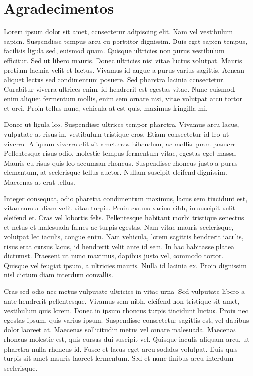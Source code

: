 \documentclass[12pt,twoside,a4paper]{book}
\begin{document}
\chapter*{Agradecimentos}



Lorem ipsum dolor sit amet, consectetur adipiscing elit. Nam vel vestibulum sapien. Suspendisse tempus arcu eu porttitor dignissim. Duis eget sapien tempus, facilisis ligula sed, euismod quam. Quisque ultricies non purus vestibulum efficitur. Sed ut libero mauris. Donec ultricies nisi vitae luctus volutpat. Mauris pretium lacinia velit et luctus. Vivamus id augue a purus varius sagittis. Aenean aliquet lectus sed condimentum posuere. Sed pharetra lacinia consectetur. Curabitur viverra ultrices enim, id hendrerit est egestas vitae. Nunc euismod, enim aliquet fermentum mollis, enim sem ornare nisi, vitae volutpat arcu tortor et orci. Proin tellus nunc, vehicula at est quis, maximus fringilla mi.

Donec ut ligula leo. Suspendisse ultrices tempor pharetra. Vivamus arcu lacus, vulputate at risus in, vestibulum tristique eros. Etiam consectetur id leo ut viverra. Aliquam viverra elit sit amet eros bibendum, ac mollis quam posuere. Pellentesque risus odio, molestie tempus fermentum vitae, egestas eget massa. Mauris eu risus quis leo accumsan rhoncus. Suspendisse rhoncus justo a purus elementum, at scelerisque tellus auctor. Nullam suscipit eleifend dignissim. Maecenas at erat tellus.

Integer consequat, odio pharetra condimentum maximus, lacus sem tincidunt est, vitae cursus diam velit vitae turpis. Proin cursus varius nibh, in suscipit velit eleifend et. Cras vel lobortis felis. Pellentesque habitant morbi tristique senectus et netus et malesuada fames ac turpis egestas. Nam vitae mauris scelerisque, volutpat leo iaculis, congue enim. Nam vehicula, lorem sagittis hendrerit iaculis, risus erat cursus lacus, id hendrerit velit ante id sem. In hac habitasse platea dictumst. Praesent ut nunc maximus, dapibus justo vel, commodo tortor. Quisque vel feugiat ipsum, a ultricies mauris. Nulla id lacinia ex. Proin dignissim nisl dictum diam interdum convallis.

Cras sed odio nec metus vulputate ultricies in vitae urna. Sed vulputate libero a ante hendrerit pellentesque. Vivamus sem nibh, eleifend non tristique sit amet, vestibulum quis lorem. Donec in ipsum rhoncus turpis tincidunt luctus. Proin nec egestas ipsum, quis varius ipsum. Suspendisse consectetur sagittis est, vel dapibus dolor laoreet at. Maecenas sollicitudin metus vel ornare malesuada. Maecenas rhoncus molestie est, quis cursus dui suscipit vel. Quisque iaculis aliquam arcu, ut pharetra nulla rhoncus id. Fusce et lacus eget arcu sodales volutpat. Duis quis turpis sit amet mauris laoreet fermentum. Sed et nunc finibus arcu interdum scelerisque.
\end{document}
